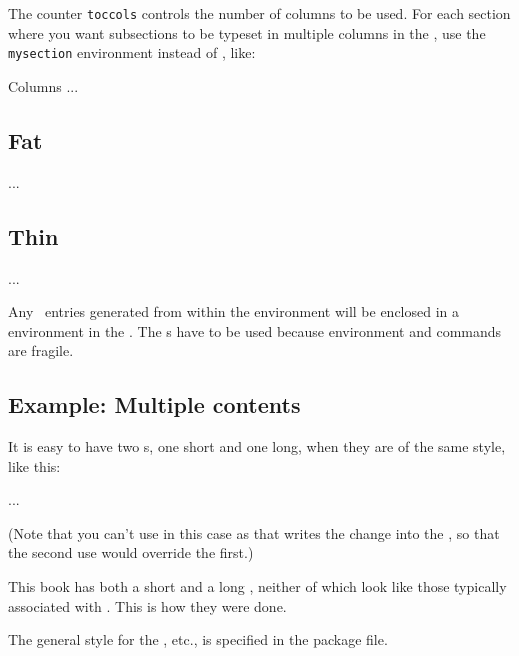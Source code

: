 The counter \texttt{toccols} controls the number of columns to be used.
For each section where you want subsections to be typeset in multiple columns
in the \toc, use the \texttt{mysection} environment instead of \cmd{\section},
like:
\begin{lcode}
\begin{mysection}{Columns}
...
\subsection{Fat}
...
\subsection{Thin}
...
\end{mysection}
\end{lcode}

Any \toc\ entries generated from within the environment will be enclosed
in a  environment in the \toc. The \cmd{\protect}s have to be
used because environment \cmd{\begin} and \cmd{\end} commands are 
fragile.
  

\subsection{Example: Multiple contents}

    It is easy to have two \toc s, one short and one long, when they are
of the same style, like this:
\begin{lcode}
...
\renewcommand*{\contentsname}{Short contents}
\setcounter{tocdepth}{0}%
\tableofcontents
\renewcommand*{\contentsname}{Contents}
\setcounter{tocdepth}{2}%
\tableofcontents
\end{lcode}
(Note that you can't use \cmd{\settocdepth} in this case as that writes the 
change into the \toc, so that the second use would override the first.)


    This book has both a short and a long \toc, neither of which look like
those typically associated with \ltx. This is how they were done.

    The general style for the \toc, etc., is specified in the 
package file.


